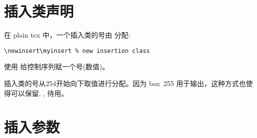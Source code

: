 \documentclass{book}
\begin{document}
\section{插入类声明}


在 plain tex 中，一个插入类的号由  分配:

\begin{verbatim}
\newinsert\myinsert % new insertion class
\end{verbatim}

使用  给控制序列赋一个号(数值)。


插入类的号从254开始向下取值进行分配。因为 box~255 用于输出，这种方式也使得可以保留, ,  待用。


\section{插入参数}
\end{document}

